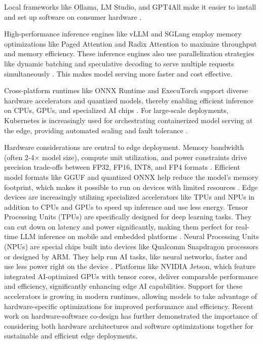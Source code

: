 \documentclass[11pt]{IEEEtran}
\begin{document}
Local frameworks like Ollama, LM Studio, and GPT4All make it easier to install and set up
software on consumer hardware \cite{b37,b38,b39}.

High-performance inference engines like vLLM and SGLang employ memory optimizations like Paged Attention and Radix Attention to maximize throughput and memory efficiency. These inference engines also use parallelization strategies like dynamic batching and speculative decoding to serve multiple requests simultaneously \cite{b40,b41}. This makes model serving more faster and cost effective. 

Cross-platform runtimes like ONNX Runtime and ExecuTorch support diverse hardware
accelerators and quantized models, thereby enabling efficient inference on CPUs, GPUs, and specialized AI chips \cite{b42,b43}. For large-scale deployments, Kubernetes is increasingly used for orchestrating containerized model serving at the edge, providing automated scaling and fault tolerance \cite{b44}.

Hardware considerations are central to edge deployment. Memory bandwidth (often 2-4× model size), compute unit utilization, and power constraints drive precision trade-offs between FP32, FP16, INT8, and FP4 formats \cite{b35,b46}. Efficient model formats like GGUF and quantized ONNX help reduce the model's memory footprint, which makes it possible to run on devices with limited resources \cite{b47,b48}. Edge devices are increasingly utilizing specialized accelerators like TPUs and NPUs in addition to CPUs and GPUs to speed up inference and use less energy. Tensor Processing Units (TPUs) are specifically designed for deep learning tasks. They can cut down on latency and power significantly, making them perfect for real-time LLM inference on mobile and embedded platforms \cite{b49}. Neural Processing Units (NPUs) are special chips built into devices like Qualcomm Snapdragon processors or designed by ARM. They help run AI tasks, like neural networks, faster and use less power right on the device \cite{b50,b51}. Platforms like NVIDIA Jetson, which feature integrated AI-optimized GPUs with tensor cores, deliver comparable performance and efficiency, significantly enhancing edge AI capabilities. Support for these accelerators is growing in modern runtimes, allowing models to take advantage of hardware-specific optimizations for improved performance and efficiency. Recent work on hardware-software co-design has further demonstrated the importance of considering both hardware architectures and software optimizations together for sustainable and efficient edge deployments\cite{b53}.
\end{document}
